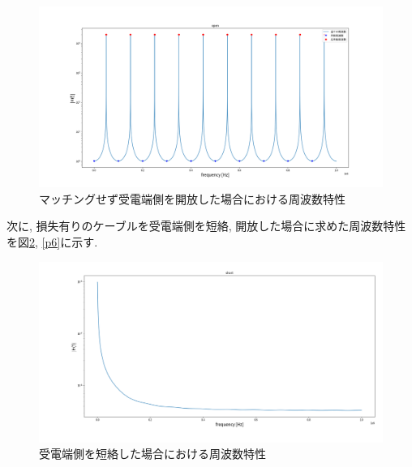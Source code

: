 \documentclass[a4j,12pt,]{jarticle}
\begin{document}
\begin{figure}[H]
  \begin{center}
    \includegraphics[width=160mm]{report/receivingEndOpenWithoutAttenuationConstantLogScale.png}
    \caption{マッチングせず受電端側を開放した場合における周波数特性}
    \label{p4}
  \end{center}
\end{figure}

次に, 損失有りのケーブルを受電端側を短絡, 開放した場合に求めた周波数特性を図\ref{p5}, \ref{p6}に示す.

\begin{figure}[H]
  \begin{center}
    \includegraphics[width=160mm]{report/shortCircuitAtReceivingEndWithDampingConstantLogScale.png}
    \caption{受電端側を短絡した場合における周波数特性}
    \label{p5}
  \end{center}
\end{figure}
\end{document}
